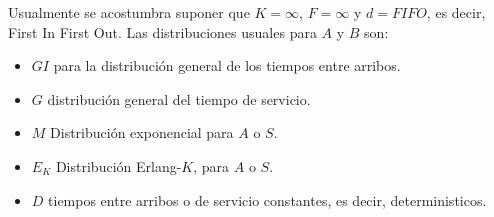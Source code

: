 Usualmente se acostumbra suponer que $K=\infty$, $F=\infty$ y $d=FIFO$, es decir, First In First Out. Las distribuciones usuales para $A$ y $B$ son:

\begin{itemize}
\item $GI$ para la distribuci\'on general de los tiempos entre arribos.
\item $G$ distribuci\'on general del tiempo de servicio.
\item $M$ Distribuci\'on exponencial para $A$ o $S$.
\item $E_{K}$ Distribuci\'on Erlang-$K$, para $A$ o $S$.
\item $D$ tiempos entre arribos o de servicio constantes, es decir, deterministicos.
\end{itemize}

